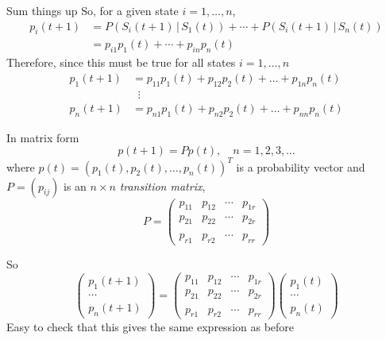 \documentclass[aspectratio=169]{beamer}\usepackage[]{graphicx}\usepackage[]{xcolor}
\begin{document}
\begin{frame}{Sum things up}
So, for a given state $i=1,\ldots,n$,
\begin{align*}
p_i(t+1) &= P(S_i(t+1)\,|\,S_1(t))+\cdots+P(S_i(t+1)\,|\,S_n(t)) \\
&= p_{i1}p_1(t)+\cdots+p_{in}p_n(t)
\end{align*}
\vfill
Therefore, since this must be true for all states $i=1,\ldots,n$
\begin{align*}
p_1(t+1) &= p_{11}p_1(t)+p_{12}p_2(t)+\dots+p_{1n}p_n(t) \\
& \;\;\vdots\\
p_n(t+1) &= p_{n1}p_1(t)+p_{n2}p_2(t)+\dots+p_{nn}p_n(t)
\end{align*}
\end{frame}

\begin{frame}
In matrix form
\[
p(t+1)=Pp(t), \quad n=1,2,3,\dots
\]
where $p(t)=(p_1(t),p_{2}(t),\dots , p_n(t))^T$ is a probability vector and $P=(p_{ij})$ is an $n\times n$ \emph{transition matrix},
\[
P=
\begin{pmatrix}
p_{11} & p_{12} & \cdots & p_{1r} \\
p_{21} & p_{22} & \cdots & p_{2r} \\
&&& \\
p_{r1} & p_{r2} & \cdots & p_{rr}
\end{pmatrix}
\]
\end{frame}


\begin{frame}
So
\[
\begin{pmatrix}
	p_1(t+1) \\ \cdots \\ p_n(t+1)
\end{pmatrix}
=
\begin{pmatrix}
p_{11} & p_{12} & \cdots & p_{1r} \\
p_{21} & p_{22} & \cdots & p_{2r} \\
&&& \\
p_{r1} & p_{r2} & \cdots & p_{rr}
\end{pmatrix}
\begin{pmatrix}
	p_1(t) \\ \cdots \\ p_n(t)
\end{pmatrix}
\]
\vfill
Easy to check that this gives the same expression as before
\end{frame}
\end{document}
